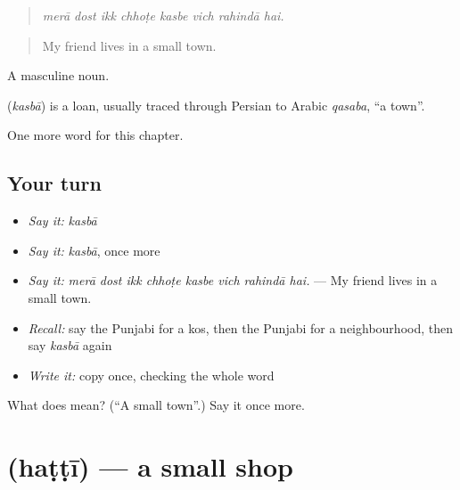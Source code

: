 \begin{quote}
       
\end{quote}

\begin{quote}
\emph{merā dost ikk chhoṭe kasbe vich rahindā hai.}
\end{quote}

\begin{quote}
My friend lives in a small town.
\end{quote}

A masculine noun.

\begin{cousinweb}
\textbf{} (\emph{kasbā}) is a loan, usually traced through Persian to Arabic \emph{qasaba}, \textquotedblleft{}a town\textquotedblright{}.
\end{cousinweb}

\begin{grammarlens}[title={What you've built}]
One more word for this chapter.
\end{grammarlens}

\subsection*{Your turn}
\begin{itemize}
\raggedright
  \item \emph{Say it:} \emph{kasbā}
  \item \emph{Say it:} \emph{kasbā}, once more
  \item \emph{Say it:} \emph{merā dost ikk chhoṭe kasbe vich rahindā hai.} — My friend lives in a small town.
  \item \emph{Recall:} say the Punjabi for a kos, then the Punjabi for a neighbourhood, then say \emph{kasbā} again
  \item \emph{Write it:} copy \textbf{} once, checking the whole word
\end{itemize}

\begin{tcolorbox}[breakable,colback=teal!4,colframe=teal!35!black,title={Before you move on}]
What does  mean? (\textquotedblleft{}A small town\textquotedblright{}.) Say it once more.
\end{tcolorbox}
\section[\texorpdfstring{\pa{ਹੱਟੀ} (haṭṭī)}{ਹੱਟੀ (haṭṭī)}]{ (haṭṭī) — a small shop}

